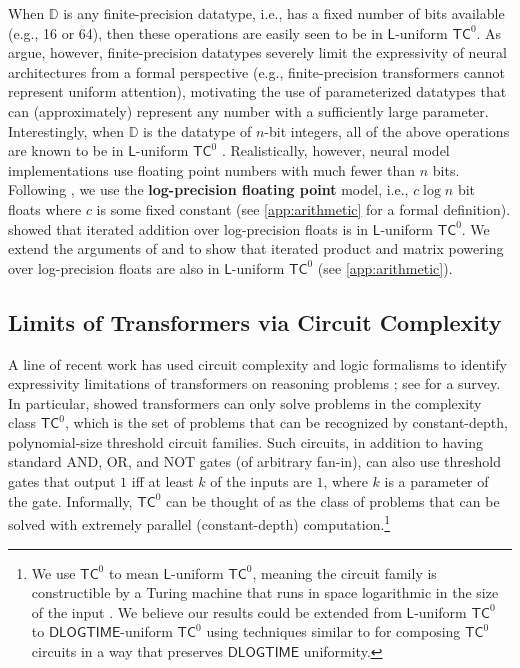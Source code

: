 When $\mathbb{D}$ is any finite-precision datatype, i.e., has a fixed number of bits available (e.g., 16 or 64), then these operations are easily seen to be in $\mathsf{L}$-uniform $\mathsf{TC}^0$. As \citet{merrill2023logic} argue, however, finite-precision datatypes severely limit the expressivity of neural architectures from a formal perspective (e.g., finite-precision transformers cannot represent uniform attention), motivating the use of parameterized datatypes that can (approximately) represent any number with a sufficiently large parameter. Interestingly, when $\mathbb{D}$ is the datatype of $n$-bit integers, all of the above operations are known to be in $\mathsf{L}$-uniform $\mathsf{TC}^0$ \cite{hesse2001division,mereghetti2000threshold}. Realistically, however, neural model implementations use floating point numbers with much fewer than $n$ bits. Following \citet{merrill2023logic}, we use the \textbf{log-precision floating point} model, i.e., $c \log n$ bit floats where $c$ is some fixed constant (see \ref{app:arithmetic} for a formal definition). \citet{merrill-sabharwal-2023-parallelism} showed that iterated addition over log-precision floats is in $\mathsf{L}$-uniform $\mathsf{TC}^0$. We extend the arguments of \citet{hesse2001division} and \citet{mereghetti2000threshold} to show that iterated product and matrix powering over log-precision floats are also in $\mathsf{L}$-uniform $\mathsf{TC}^0$ (see \ref{app:arithmetic}).

\subsection{Limits of Transformers via Circuit Complexity} \label{sec:circuits}

A line of recent work has used circuit complexity and logic formalisms to identify expressivity limitations of transformers on reasoning problems \cite{angluin-2023-BRASP,merrill-sabharwal-2023-parallelism,liu2023transformers,chiang2023tighter,merrill2023logic,hao2022ac0}; see \citealp{strobl2023transformers} for a survey. In particular, \citet{merrill-sabharwal-2023-parallelism} showed transformers can only solve problems in the complexity class $\mathsf{TC}^0$, which is the set of problems that can be recognized by constant-depth, polynomial-size threshold circuit families. Such circuits, in addition to having standard AND, OR, and NOT gates (of arbitrary fan-in), can also use threshold gates that output $1$ iff at least $k$ of the inputs are $1$, where $k$ is a parameter of the gate. Informally, $\mathsf{TC}^0$ can be thought of as the class of problems that can be solved with extremely parallel (constant-depth) computation.\footnote{We use $\mathsf{TC}^0$ to mean $\mathsf{L}$-uniform $\mathsf{TC}^0$, meaning the circuit family is constructible by a Turing machine that runs in space logarithmic in the size of the input \citep[cf.][]{merrill-sabharwal-2023-parallelism,strobl2023transformers}.
We believe our results could be extended from $\mathsf{L}$-uniform $\mathsf{TC}^0$ to $\mathsf{DLOGTIME}$-uniform $\mathsf{TC}^0$ using techniques similar to \citet{merrill2023logic} for composing $\mathsf{TC}^0$ circuits in a way that preserves $\mathsf{DLOGTIME}$ uniformity. }

